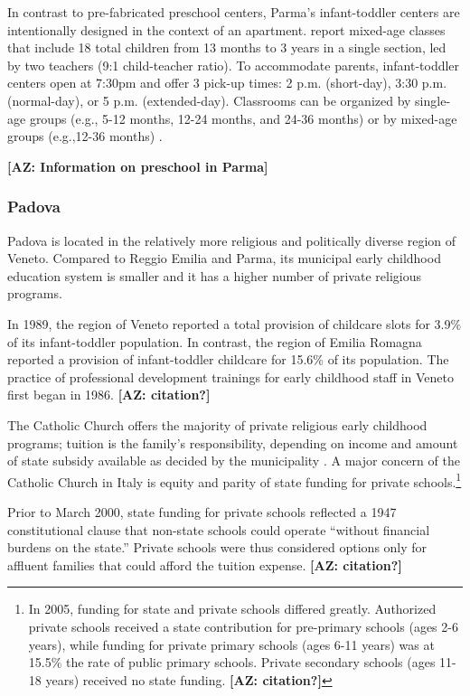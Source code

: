 In contrast to pre-fabricated preschool centers, Parma's infant-toddler centers are intentionally designed in the context of an apartment. \citet{Terzi-Cantarelli_2001_Parma} report mixed-age classes that include 18 total children from 13 months to 3 years in a single section, led by two teachers (9:1 child-teacher ratio). To accommodate parents, infant-toddler centers open at 7:30pm and offer 3 pick-up times: 2 p.m. (short-day), 3:30 p.m. (normal-day), or 5 p.m. (extended-day). Classrooms can be organized by single-age groups (e.g., 5-12 months, 12-24 months, and 24-36 months) or by mixed-age groups (e.g.,12-36 months) \citep{Majorano-etal_2009_CC-in-P}.

\textbf{[AZ: Information on preschool in Parma]}

\subsubsection{Padova}
Padova is located in the relatively more religious and politically diverse region of Veneto. Compared to Reggio Emilia and Parma, its municipal early childhood education system is smaller and it has a higher number of private religious programs. 

In 1989, the region of Veneto reported a total provision of childcare slots for 3.9\% of its infant-toddler population. In contrast, the region of Emilia Romagna reported a provision of infant-toddler childcare for 15.6\% of its population. The practice of professional development trainings for early childhood staff in Veneto first began in 1986. \textbf{[AZ: citation?]}

The Catholic Church offers the majority of private religious early childhood programs; tuition is the family's responsibility, depending on income and amount of state subsidy available as decided by the municipality \citep{Hohnerlein_2009_Paradox-Public-Preschools}.  A major concern of the Catholic Church in Italy is equity and parity of state funding for private schools.\footnote{In 2005, funding for state and private schools differed greatly. Authorized private schools received a state contribution for pre-primary schools (ages 2-6 years), while funding for private primary schools (ages 6-11 years) was at 15.5\% the rate of public primary schools. Private secondary schools (ages 11-18 years) received no state funding. \textbf{[AZ: citation?]}}

Prior to March 2000, state funding for private schools reflected a 1947 constitutional clause that non-state schools could operate ``without financial burdens on the state.'' Private schools were thus considered options only for affluent families that could afford the tuition expense. \textbf{[AZ: citation?]}
